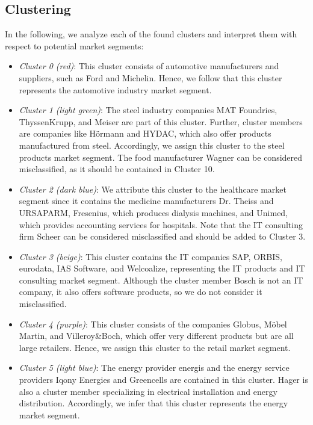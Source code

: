 \documentclass[conference]{IEEEtran}
\begin{document}
\subsection{Clustering}
\label{sec:clustering-results}
In the following, we analyze each of the found clusters and interpret them with respect to potential market segments:
\begin{itemize}
	\item \textit{Cluster 0 (red)}: This cluster consists of automotive manufacturers and suppliers, such as Ford and Michelin. Hence, we follow that this cluster represents the automotive industry market segment.
	
	\item \textit{Cluster 1 (light green)}: The steel industry companies MAT Foundries, ThyssenKrupp, and Meiser are part of this cluster. Further, cluster members are companies like Hörmann and HYDAC, which also offer products manufactured from steel. Accordingly, we assign this cluster to the steel products market segment. The food manufacturer Wagner can be considered misclassified, as it should be contained in Cluster 10.
	
	\item \textit{Cluster 2 (dark blue)}: We attribute this cluster to the healthcare market segment since it contains the medicine manufacturers Dr. Theiss and URSAPARM, Fresenius, which produces dialysis machines, and Unimed, which provides accounting services for hospitals. Note that the IT consulting firm Scheer can be considered misclassified and should be added to Cluster 3.
	
	\item \textit{Cluster 3 (beige)}: This cluster contains the IT companies SAP, ORBIS, eurodata, IAS Software, and Welcoalize, representing the IT products and IT consulting market segment. Although the cluster member Bosch is not an IT company, it also offers software products, so we do not consider it misclassified.
	
	\item \textit{Cluster 4 (purple)}: This cluster consists of the companies Globus, Möbel Martin, and Villeroy\&Boch, which offer very different products but are all large retailers. Hence, we assign this cluster to the retail market segment. 
	
	\item \textit{Cluster 5 (light blue)}: The energy provider energis and the energy service providers Iqony Energies and Greencells are contained in this cluster. Hager is also a cluster member specializing in electrical installation and energy distribution. Accordingly, we infer that this cluster represents the energy market segment.
	

\end{itemize}
\end{document}
